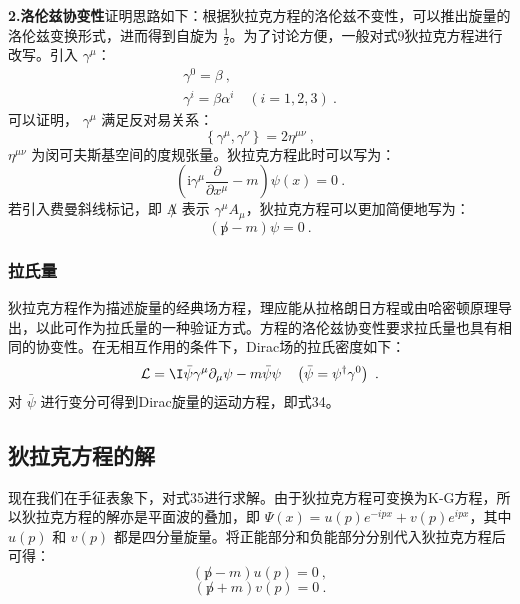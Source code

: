 \textbf{2.洛伦兹协变性}证明思路如下：根据狄拉克方程的洛伦兹不变性，可以推出旋量的洛伦兹变换形式，进而得到自旋为 $\frac{1}{2}$。为了讨论方便，一般对式9狄拉克方程进行改写。引入 $\gamma^{\mu}$：
\begin{equation}
\begin{array}{l}
\gamma^{0}=\beta~, \\
\gamma^{i}=\beta \alpha^{i} \quad(i=1,2,3)~.
\end{array}
\end{equation}
可以证明， $\gamma^{\mu}$ 满足反对易关系：
\begin{equation}
\left\{\gamma^{\mu}, \gamma^{\nu}\right\}=2 \eta^{\mu \nu}~,
\end{equation}
$\eta^{\mu \nu}$ 为闵可夫斯基空间的度规张量。狄拉克方程此时可以写为：
\begin{equation}\label{eq_qed4_22}
\left(\mathrm{i} \gamma^{\mu} \frac{\partial}{\partial x^{\mu}}-m\right) \psi(x)=0~.
\end{equation}
若引入费曼斜线标记，即 $\not A$ 表示 $\gamma^{\mu}A_{\mu}$，狄拉克方程可以更加简便地写为：
\begin{equation}\label{eq_qed4_21}
( \not p-m) \psi=0~.
\end{equation}
\subsubsection{拉氏量}
狄拉克方程作为描述旋量的经典场方程，理应能从拉格朗日方程或由哈密顿原理导出，以此可作为拉氏量的一种验证方式。方程的洛伦兹协变性要求拉氏量也具有相同的协变性。在无相互作用的条件下，Dirac场的拉氏密度如下：
\begin{equation}\label{eq_qed4_20}
\mathcal{L}=\mathrm{\I} \bar{\psi} \gamma^{\mu} \partial_{\mu} \psi-m \bar{\psi} \psi \quad\left(\bar{\psi}=\psi^{\dagger} \gamma^{0}\right)~.
\end{equation}
对 $\bar\psi$ 进行变分可得到Dirac旋量的运动方程，即式34。

\subsection{狄拉克方程的解}
现在我们在手征表象下，对式35进行求解。由于狄拉克方程可变换为K-G方程，所以狄拉克方程的解亦是平面波的叠加，即 $\Psi(x)=u(p)e^{-ipx}+v(p)e^{ipx}$，其中 $u(p)$ 和 $v(p)$ 都是四分量旋量。将正能部分和负能部分分别代入狄拉克方程后可得：
\begin{equation}\label{eq_qed4_23}
(\not p-m) u(p)=0 ~,
\end{equation}
\begin{equation}
(\not p+m) v(p)=0~.
\end{equation}


